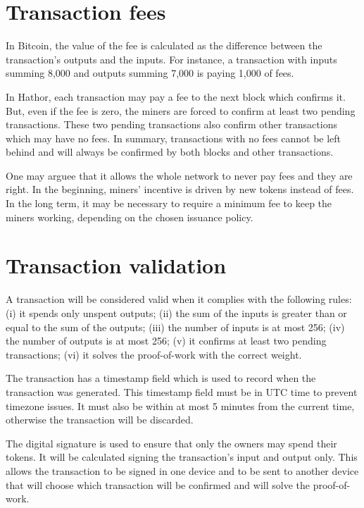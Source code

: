 \section{Transaction fees}

In Bitcoin, the value of the fee is calculated as the difference between the transaction's outputs and the inputs. For instance, a transaction with inputs summing 8,000 and outputs summing 7,000 is paying 1,000 of fees.

In Hathor, each transaction may pay a fee to the next block which confirms it. But, even if the fee is zero, the miners are forced to confirm at least two pending transactions. These two pending transactions also confirm other transactions which may have no fees. In summary, transactions with no fees cannot be left behind and will always be confirmed by both blocks and other transactions.

One may arguee that it allows the whole network to never pay fees and they are right. In the beginning, miners' incentive is driven by new tokens instead of fees. In the long term, it may be necessary to require a minimum fee to keep the miners working, depending on the chosen issuance policy.


\section{Transaction validation}

A transaction will be considered valid when it complies with the following rules: (i) it spends only unspent outputs; (ii) the sum of the inputs is greater than or equal to the sum of the outputs; (iii) the number of inputs is at most 256; (iv) the number of outputs is at most 256; (v) it confirms at least two pending transactions; (vi) it solves the proof-of-work with the correct weight.

The transaction has a timestamp field which is used to record when the transaction was generated. This timestamp field must be in UTC time to prevent timezone issues. It must also be within at most 5 minutes from the current time, otherwise the transaction will be discarded.

The digital signature is used to ensure that only the owners may spend their tokens. It will be calculated signing the transaction's input and output only. This allows the transaction to be signed in one device and to be sent to another device that will choose which transaction will be confirmed and will solve the proof-of-work.

